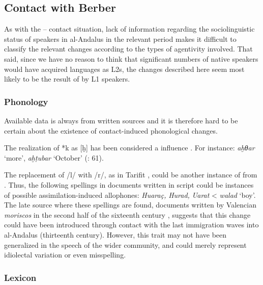 \documentclass[output=paper,modfonts,nonflat]{langsci/langscibook}
\begin{document}
\subsection{Contact with Berber}

As with the – contact situation, lack of information regarding the sociolinguistic status of  speakers in al-Andalus in the relevant period makes it difficult to classify the relevant changes according to the types of agentivity involved. That said, since we have no reason to think that significant numbers of native  speakers would have acquired  languages as L2s, the changes described here seem most likely to be the result of  by L1  speakers.

\subsubsection{Phonology}

Available data is always from written sources and it is therefore hard to be certain about the existence of contact-induced phonological changes. 

The realization of *k as [ḫ] has been considered a   influence \citep[7]{Corriente1981}. For instance: \textit{aḫθar} ‘more’, \textit{aḫṭubar} ‘October’ (\citealt{CorrientePereiraVicente2015}: 61).  

The replacement of /l/ with /r/, as in Tarifit , could be another instance of  from . Thus, the following spellings in documents written in  script could be instances of possible assimilation-induced allophones: \textit{Huaraç,} \textit{Hurad,} \textit{Uarat} < \textit{walad} ‘boy’. The late source where these spellings are found, documents written by Valencian \textit{moriscos} in the second half of the sixteenth century \citep{Labarta1987}, suggests that this change could have been introduced through contact with the last  immigration waves into al-Andalus (thirteenth century). However, this trait may not have been generalized in the speech of the wider community, and could merely represent idiolectal variation or even misspelling. 

\subsubsection{Lexicon}
\end{document}
